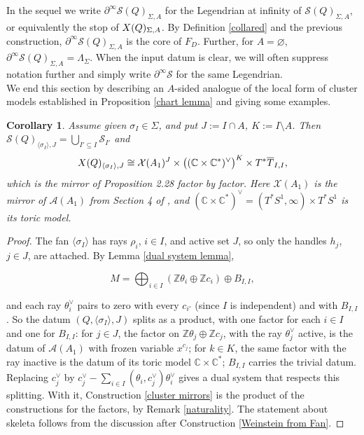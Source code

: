 \documentclass[11pt]{amsart}
\newtheorem{cor}[thm]{Corollary}
\theoremstyle{definition}
\theoremstyle{remark}
\newcommand{\X}{\mathcal{X}}
\renewcommand{\emptyset}{\varnothing}
\numberwithin{equation}{section}
\begin{document}
In the sequel we write $\partial^\infty\mathcal S(Q)_{\Sigma,A}$ for the Legendrian at infinity of $\mathcal S(Q)_{\Sigma,A}$, or equivalently the stop of $\mathcal \X(Q)_{\Sigma,A}$. By Definition \ref{collared} and the previous construction, $\partial^\infty\mathcal S(Q)_{\Sigma,A}$ is the core of $F_D$. Further, for $A=\emptyset$, $\partial^\infty\mathcal S(Q)_{\Sigma,A}=\Lambda_\Sigma$. When the input datum is clear, we will often suppress notation further and simply write $\partial^\infty \mathcal{S}$ for the same Legendrian.\\

We end this section by describing an $A$-sided analogue of the local form of cluster models established in Proposition \ref{chart lemma} and giving some examples.
 
\begin{cor} \label{cor:charts}
Assume given $\sigma_I\in\Sigma$, and put $J:=I\cap A$, $K:=I\setminus A$. Then $\mathcal S(Q)_{\langle\sigma_I\rangle,J}=\bigcup_{I'\subseteq I}\mathcal S_{I'}$ and $$\mathcal \X(Q)_{\langle\sigma_I\rangle,J}\cong\mathcal X(A_1)^J\times\bigl((\mathbb C\times\mathbb C^*)^\vee\bigr)^K\times T^*\overline{T}_{I,I},$$ which is the mirror of Proposition 2.28 factor by factor. Here $\mathcal X(A_1)$ is the mirror of $\mathcal A(A_1)$ from Section 4 of \cite{GL}, and $(\mathbb C\times\mathbb C^*)^\vee=(T^*S^1,\infty)\times T^*S^1$ is its toric model.
\end{cor}
 
\begin{proof}
The fan $\langle\sigma_I\rangle$ has rays $\rho_i$, $i\in I$, and active set $J$, so only the handles $h_j$, $j\in J$, are attached. By Lemma \ref{dual system lemma},

$$M=\bigoplus_{i\in I}(\mathbb Z\theta_i\oplus\mathbb Zc_i)\oplus B_{I,I},$$

and each ray $\theta_i^\vee$ pairs to zero with every $c_{i'}$ (since $I$ is independent) and with $B_{I,I}$. So the datum $(Q,\langle\sigma_I\rangle,J)$ splits as a product, with one factor for each $i\in I$ and one for $B_{I,I}$: for $j\in J$, the factor on $\mathbb Z\theta_j\oplus\mathbb Zc_j$, with the ray $\theta_j^\vee$ active, is the datum of $\mathcal A(A_1)$ with frozen variable $x^{c_j}$;
for $k\in K$, the same factor with the ray inactive is the datum of its toric model $\mathbb C\times\mathbb C^*$;
$B_{I,I}$ carries the trivial datum.\\

Replacing $c_j^\vee$ by $c_j^\vee-\sum_{i\in I}(\theta_i,c_j^\vee)\theta_i^\vee$ gives a dual system that respects this splitting. With it, Construction \ref{cluster mirrors} is the product of the constructions for the factors, by Remark \ref{naturality}. The statement about skeleta follows from the discussion after Construction \ref{Weinstein from Fan}.
\end{proof}
\end{document}

